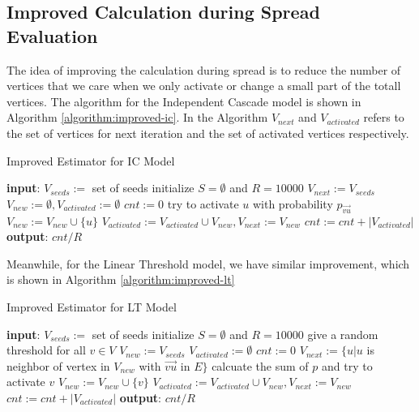 \documentclass[journal,twoside,web]{ieeecolor}
\begin{document}
\subsection{Improved Calculation during Spread Evaluation}

The idea of improving the calculation during spread is to reduce the number of vertices that we care when we only activate or change a small part of the totall vertices. The algorithm for the Independent Cascade model is shown in Algorithm \ref{algorithm:improved-ic}. In the Algorithm $V_{next}$ and $V_{activated}$ refers to the set of vertices for next iteration and the set of activated vertices respectively.
\begin{algorithm}
\caption{Improved Estimator for IC Model}
\label{algorithm:improved-ic}
\begin{algorithmic} [1]
\STATE \textbf{input}: $V_{seeds}:= $ set of seeds
\STATE initialize $S=\emptyset$ and $R = 10000$
\STATE $V_{next} := V_{seeds}$
\STATE $V_{new} := \emptyset,  V_{activated} := \emptyset$
\STATE $cnt := 0$
\STATE try to activate $u$ with probability $p_{\overrightarrow{vu}}$
\STATE $V_{new}:=V_{new}\cup \{u\}$
\ENDIF
\ENDFOR
\ENDFOR
\STATE $ V_{activated} := V_{activated} \cup V_{new},  V_{next} :=V_{new}$
\ENDWHILE
\STATE $cnt := cnt + |V_{activated}| $
\ENDFOR
\STATE \textbf{output}: $cnt/R$
\end{algorithmic}
\end{algorithm}

\par
Meanwhile, for the Linear Threshold model, we have similar improvement, which is shown in Algorithm \ref{algorithm:improved-lt} 
\begin{algorithm}
\caption{Improved Estimator for LT Model}
\label{algorithm:improved-lt}
\begin{algorithmic} [1]
\STATE \textbf{input}: $V_{seeds}:= $ set of seeds
\STATE initialize $S=\emptyset$ and $R = 10000$
\STATE give a random threshold for all $v \in V$
\STATE $V_{new} := V_{seeds}$
\STATE $V_{activated} := \emptyset$
\STATE $cnt := 0$
\STATE $V_{next} := \{u| u$ is neighbor of vertex in $V_{new}$ with $\overrightarrow{vu}$ in $E \}$
\STATE calcuate the sum of $p$ and try to activate $v$
\STATE $V_{new}:=V_{new}\cup \{v\}$
\ENDIF
\ENDFOR
\STATE $ V_{activated} := V_{activated} \cup V_{new},  V_{next} :=V_{new}$
\ENDWHILE
\STATE $cnt := cnt + |V_{activated}| $
\ENDFOR
\STATE \textbf{output}: $cnt/R$
\end{algorithmic}
\end{algorithm}
\end{document}
